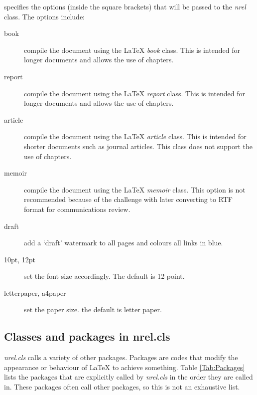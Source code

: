 \noindent specifies the options (inside the square brackets) that will be passed to the \emph{nrel} class. The options include:
\begin{description}
\item[book]{compile the document using the LaTeX \emph{book} class. This is intended for longer documents and allows the use of chapters.}
\item[report]{compile the document using the LaTeX \emph{report} class. This is intended for longer documents and allows the use of chapters.}
\item[article]{compile the document using the LaTeX \emph{article} class. This is intended for shorter documents such as journal articles. This class does not support the use of chapters.}
\item[memoir]{compile the document using the LaTeX \emph{memoir} class. This option is not recommended because of the challenge with later converting to RTF format for communications review.}
\item[draft]{add a `draft' watermark to all pages and colours all links in blue.}
\item[10pt, 12pt]{set the font size accordingly. The default is 12 point.}
\item[letterpaper, a4paper]{set the paper size. the default is letter paper.}
\end{description}

\subsection{Classes and packages in nrel.cls}
\emph{nrel.cls} calls a variety of other packages. Packages are codes that modify the appearance or behaviour of LaTeX to achieve something. Table \ref{Tab:Packages} lists the packages that are explicitly called by \emph{nrel.cls} in the order they are called in. These packages often call other packages, so this is not an exhaustive list.

